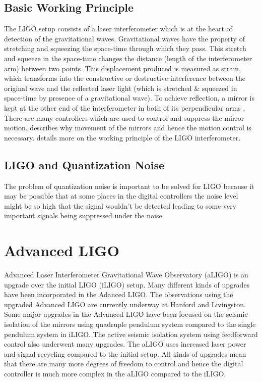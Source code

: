 \documentclass[colorlinks=true,pdfstartview=FitV,linkcolor=blue,
            citecolor=red,urlcolor=magenta]{ligodoc}
\begin{document}
	\subsection{Basic Working Principle}The LIGO setup consists of a laser interferometer \cite{Interferometer} which is at the heart of detection of the gravitational waves. Gravitational waves have the property of stretching and squeezing the space-time through which they pass. This stretch and squeeze in the space-time changes the distance (length of the interferometer arm) between two points. This displacement produced is measured as strain, which transforms into the constructive or destructive interference between the original wave and the reflected laser light (which is stretched \& squeezed in space-time by presence of a gravitational wave). To achieve reflection, a mirror is kept at the other end of the interferometer in both of its perpendicular arms \cite{Interferometer}. There are many controllers which are used to control and suppress the mirror motion. \cite{Carbone} describes why movement of the mirrors and hence the motion control is necessary. \cite{Interferometer} details more on the working principle of the LIGO interferometer.
	
	\subsection{LIGO and Quantization Noise} The problem of quantization noise is important to be solved for LIGO because it may be possible that at some places in the digital controllers the noise level might be so high that the signal wouldn't be detected leading to some very important signals being suppressed under the noise.
\section{Advanced LIGO}
Advanced Laser Interferometer Gravitational Wave Observatory (aLIGO) is an upgrade over the initial LIGO (iLIGO)\cite{LIGO} setup. Many different kinds of upgrades have been incorporated in the Adanced LIGO. The observations using the upgraded Advanced LIGO are currently underway at Hanford and Livingston. Some major upgrades in the Advanced LIGO have been focused on the seismic isolation of the mirrors using quadruple pendulum system compared to the single pendulum system in iLIGO. The active seismic isolation system using feedforward control also underwent many upgrades. The aLIGO uses increased laser power and signal recycling compared to the initial setup. All kinds of upgrades mean that there are many more degrees of freedom to control and hence the digital controller is much more complex in the aLIGO compared to the iLIGO.
\end{document}

